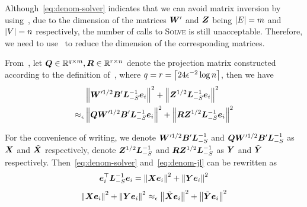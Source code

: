 \documentclass[sigconf]{acmart}
\begin{document}
Although~\eqref{eq:denom-solver} indicates that we can avoid matrix inversion by using~, due to the dimension of the matrices \(\boldsymbol{W}'\) and \(\boldsymbol{Z}\) being \(\left|E \right|=m\) and \(\left|V \right|=n\) respectively, the number of calls to \textsc{Solve} is still unacceptable.
Therefore, we need to use~ to reduce the dimension of the corresponding matrices.

From~, let \(\boldsymbol{Q}\in\mathbb{R}^{q\times m},\boldsymbol{R}\in\mathbb{R}^{r\times n}\) denote the projection matrix constructed according to the definition of~, where \(q=r=\left\lceil24\epsilon^{-2}\log n\right\rceil\), then we have
\begin{equation}\label{eq:denom-jl}
    \begin{split}
        &\left\Vert\boldsymbol{W}'^{1/2}\boldsymbol{B}'\boldsymbol{L}_{-S}^{-1}\boldsymbol{e}_i\right\Vert^2+\left\Vert\boldsymbol{Z}^{1/2}\boldsymbol{L}_{-S}^{-1}\boldsymbol{e}_i\right\Vert^2\\
        \approx_\epsilon&\left\Vert\boldsymbol{Q}\boldsymbol{W}'^{1/2}\boldsymbol{B}'\boldsymbol{L}_{-S}^{-1}\boldsymbol{e}_i\right\Vert^2+\left\Vert\boldsymbol{R}\boldsymbol{Z}^{1/2}\boldsymbol{L}_{-S}^{-1}\boldsymbol{e}_i\right\Vert^2
    \end{split}
\end{equation}

For the convenience of writing, we denote \(\boldsymbol{W}'^{1/2}\boldsymbol{B}'\boldsymbol{L}_{-S}^{-1}\) and \(\boldsymbol{Q}\boldsymbol{W}'^{1/2}\boldsymbol{B}'\boldsymbol{L}_{-S}^{-1}\) as \(\boldsymbol{X}\) and \(\tilde{\boldsymbol{X}}\) respectively, denote \(\boldsymbol{Z}^{1/2}\boldsymbol{L}_{-S}^{-1}\) and \(\boldsymbol{R}\boldsymbol{Z}^{1/2}\boldsymbol{L}_{-S}^{-1}\) as \(\boldsymbol{Y}\) and \(\tilde{\boldsymbol{Y}}\) respectively.
Then~\eqref{eq:denom-solver} and~\eqref{eq:denom-jl} can be rewritten as
\begin{equation}\label{eq:denom-solver-simp}
    \boldsymbol{e}_i^\top\boldsymbol{L}_{-S}^{-1}\boldsymbol{e}_i=\left\Vert\boldsymbol{X}\boldsymbol{e}_i\right\Vert^2+\left\Vert\boldsymbol{Y}\boldsymbol{e}_i\right\Vert^2
\end{equation}
\begin{equation}\label{eq:denom-jl-simp}
    \left\Vert\boldsymbol{X}\boldsymbol{e}_i\right\Vert^2+\left\Vert\boldsymbol{Y}\boldsymbol{e}_i\right\Vert^2\approx_\epsilon\left\Vert\tilde{\boldsymbol{X}}\boldsymbol{e}_i\right\Vert^2+\left\Vert\tilde{\boldsymbol{Y}}\boldsymbol{e}_i\right\Vert^2
\end{equation}
\end{document}
